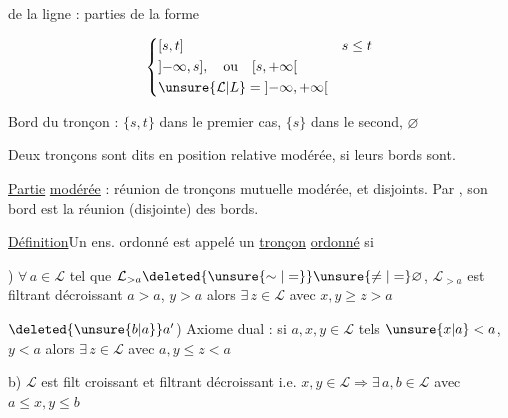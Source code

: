 
 de la ligne : parties
de la forme

\[
\left\{\begin{aligned}
 &[s,t] &&s\leq t\\
 &\mathopen{]}-\infty,s],\quad\text{ou}\quad [s,+\infty\mathclose{[}\\
 &\unsure{\mathcal L|L}=\mathopen{]}-\infty,+\infty\mathclose{[}
\end{aligned}\right.
\]

Bord du tronçon : $\{s,t\}$ dans le
premier cas, $\{s\}$ dans le second, $\varnothing$ 

Deux tronçons sont dits en
position relative modérée, si leurs
bords \unsure{:|}  sont.

\uline{Partie} \uline{modérée} :
réunion  de tronçons  mutuelle
modérée, et disjoints.  Par
, son bord est la réunion
(disjointe) des bords.




\uline{Définition}\quad Un ens. ordonné  est appelé un \uline{tronçon} \uline{ordonné} si

) $\forall\,a\in\mathcal L$ tel que $\mathcal L_{>a}\deleted{\unsure{\sim|=}}\unsure{\ne|=}\varnothing$, $\mathcal L_{>a}$ est filtrant décroissant
 
$a>a$, $y>a$ alors $\exists\,z\in\mathcal L$ avec $x,y\geq z>a$

$\deleted{\unsure{b|a}}a'$) Axiome dual : si $a,x,y\in\mathcal L$ tels 
$\unsure{x|a}<a$, $y<a$ alors $\exists\,z\in\mathcal L$ avec $a,y\leq z<a$

b) $\mathcal L$ est filt croissant et filtrant décroissant i.e.
$x,y\in\mathcal L\Rightarrow\exists\,a,b\in\mathcal L$ avec $a\leq x,y\leq b$

